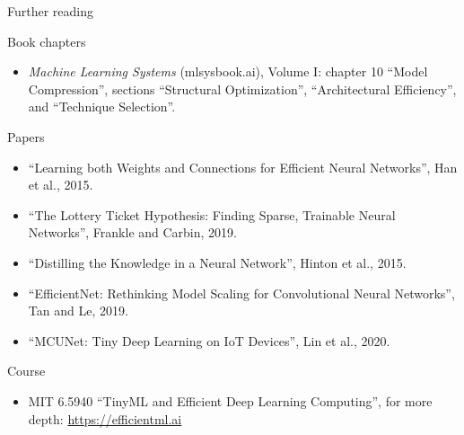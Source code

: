 \begin{frame}{Further reading}
  \footnotesize
  \begin{block}{Book chapters}
    \begin{itemize}
      \item \emph{Machine Learning Systems} (mlsysbook.ai), Volume I: chapter
            10 ``Model Compression'', sections ``Structural Optimization'',
            ``Architectural Efficiency'', and ``Technique Selection''.
    \end{itemize}
  \end{block}
  \begin{block}{Papers}
    \begin{itemize}
      \item ``Learning both Weights and Connections for Efficient Neural
            Networks'', Han et al., 2015.
      \item ``The Lottery Ticket Hypothesis: Finding Sparse, Trainable Neural
            Networks'', Frankle and Carbin, 2019.
      \item ``Distilling the Knowledge in a Neural Network'', Hinton et al.,
            2015.
      \item ``EfficientNet: Rethinking Model Scaling for Convolutional Neural
            Networks'', Tan and Le, 2019.
      \item ``MCUNet: Tiny Deep Learning on IoT Devices'', Lin et al., 2020.
    \end{itemize}
  \end{block}
  \begin{block}{Course}
    \begin{itemize}
      \item MIT 6.5940 ``TinyML and Efficient Deep Learning Computing'', for
            more depth: \url{https://efficientml.ai}
    \end{itemize}
  \end{block}
\end{frame}
